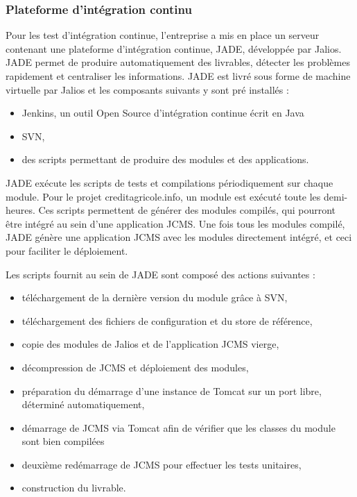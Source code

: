 \documentclass[12pt,a4paper]{article}
\begin{document}
\subsubsection{Plateforme d'intégration continu}
Pour les test d'intégration continue, l'entreprise a mis en place un serveur contenant une plateforme d'intégration continue, \gls{JADE}, développée par Jalios. \gls{JADE} permet de produire automatiquement des livrables, détecter les problèmes rapidement et centraliser les informations. \gls{JADE} est livré sous forme de machine virtuelle par Jalios et les composants suivants y sont pré installés : 
\begin{itemize}
\item Jenkins, un outil Open Source d'intégration continue écrit en Java
\item \gls{SVN},
\item des scripts permettant de produire des modules et des applications.
\end{itemize}
\gls{JADE} exécute les scripts de tests et compilations périodiquement sur chaque module. Pour le projet creditagricole.info, un module est exécuté toute les demi-heures. Ces scripts permettent de générer des modules compilés, qui pourront être intégré au sein d'une application \gls{JCMS}. Une fois tous les modules compilé, \gls{JADE} génère une application \gls{JCMS} avec les modules directement intégré, et ceci pour faciliter le déploiement.\par
Les scripts fournit au sein de \gls{JADE} sont composé des actions suivantes : 
\begin{itemize}
\item téléchargement de la dernière version du module grâce à \gls{SVN},
\item téléchargement des fichiers de configuration et du store de référence,
\item copie des modules de Jalios et de l'application \gls{JCMS} vierge,
\item décompression de \gls{JCMS} et déploiement des modules,
\item préparation du démarrage d'une instance de Tomcat sur un port libre, déterminé automatiquement,
\item démarrage de \gls{JCMS} via Tomcat afin de vérifier que les classes du module sont bien compilées
\item deuxième redémarrage de \gls{JCMS} pour effectuer les tests unitaires,
\item construction du livrable.
\end{itemize}\par 
\end{document}

